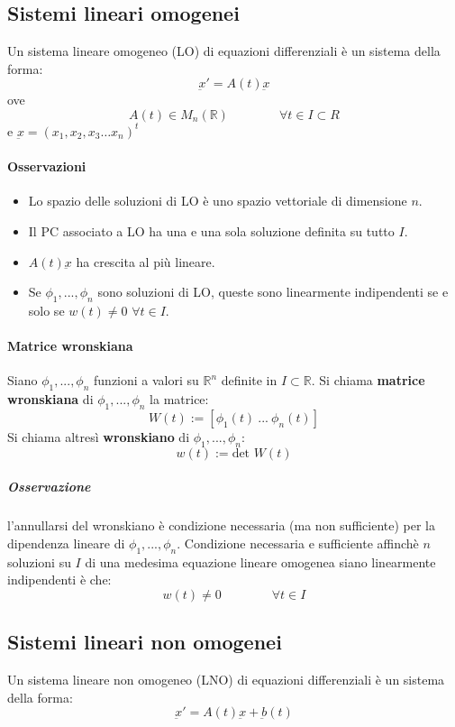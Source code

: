 \documentclass[a4paper,12pt]{article}
\begin{document}
\subsection{Sistemi lineari omogenei}
Un sistema lineare omogeneo (LO) di equazioni differenziali è un sistema della forma:
$$\underbar{x}' = A(t)\underbar{x}$$ 
ove $$A(t)\in M_n(\mathbb{R})\qquad \qquad \forall t\in I\subset R$$ e $\underbar{x} = (x_1,x_2,x_3 \dots x_n)^t$
\paragraph{Osservazioni}
\begin{itemize}
 \item Lo spazio delle soluzioni di LO è uno spazio vettoriale di dimensione $n$.
 \item Il PC associato a LO ha una e una sola soluzione definita su tutto $I$.
 \item $A(t)\underbar{x}$ ha crescita al più lineare.
 \item Se $\phi_1,...,\phi_n$ sono soluzioni di LO, queste sono linearmente indipendenti se e solo se $w(t)\neq0$ $\forall t \in I$.
\end{itemize}


\paragraph{Matrice wronskiana}
Siano $\phi_1,...,\phi_n$ funzioni a valori su $\mathbb{R}^n$ definite in $I\subset \mathbb{R}$.
Si chiama \textbf{matrice wronskiana} di $\phi_1,...,\phi_n$ la matrice:
$$W(t):=[\phi_1(t)\ ...\ \phi_n(t)]$$
Si chiama altresì \textbf{wronskiano} di $\phi_1,...,\phi_n$:
$$w(t):=\text{det } W(t)$$
\subparagraph*{Osservazione} l'annullarsi del wronskiano è condizione necessaria (ma non sufficiente) per la dipendenza lineare di $\phi_1,...,\phi_n$. 
Condizione necessaria e sufficiente affinchè $n$ soluzioni su $I$ di una medesima equazione lineare omogenea siano linearmente indipendenti è che:
$$ w(t)\neq0 \qquad\qquad \forall t \in I$$

\subsection{Sistemi lineari non omogenei}
Un sistema lineare non omogeneo (LNO) di equazioni differenziali è un sistema della forma:
$$\underbar{x}' = A(t)\underbar{x} + \underbar{b}(t)$$
\end{document}
